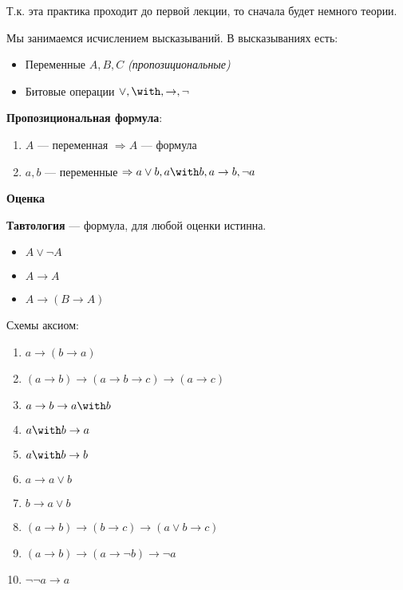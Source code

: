 

\cfoot{}



Т.к. эта практика проходит до первой лекции, то сначала будет немного теории.

Мы занимаемся исчислением высказываний. В высказываниях есть:
\begin{itemize}
    \item Переменные \(A, B, C\) \textit{(пропозициональные)}
    \item Битовые операции \(\lor, \with, \to, \neg\)
\end{itemize}

\begin{definition}
    \textbf{Пропозициональная формула}:
    \begin{enumerate}
        \item \(A\) --- переменная \( \Rightarrow A\) --- формула
        \item \(a, b\) --- переменные \(\Rightarrow a \lor b, a \with b, a \to b, \neg a\)
    \end{enumerate}
\end{definition}

\begin{definition}
    \textbf{Оценка} \?
\end{definition}

\begin{definition}
    \textbf{Тавтология} --- формула, для любой оценки истинна.
\end{definition}

\begin{example}\itemfix
    \begin{itemize}
        \item \(A \lor \neg A\)
        \item \(A \to A\)
        \item \(A \to (B \to A)\)
    \end{itemize}
\end{example}

Схемы аксиом:
\begin{enumerate}
    \item \(a \to (b \to a)\)
    \item \((a \to b) \to (a \to b \to c) \to (a \to c)\)
    \item \(a \to b \to a \with b\)
    \item \(a \with b \to a\)
    \item \(a \with b \to b\)
    \item \(a \to a \lor b\)
    \item \(b \to a \lor b\)
    \item \((a \to b) \to (b \to c) \to (a \lor b \to c)\)
    \item \((a \to b) \to (a \to \neg b) \to \neg a\)
    \item \(\neg \neg a \to a\)
\end{enumerate}

